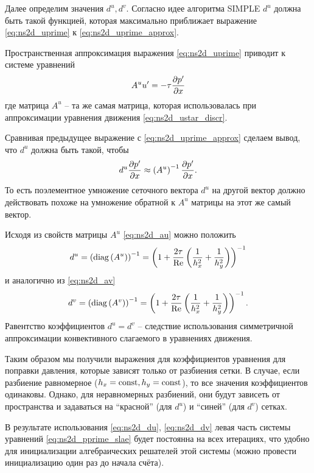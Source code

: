 Далее определим значения $d^u, d^v$.
Согласно идее алгоритма SIMPLE $d^u$ должна
быть такой функцией, которая максимально приближает
выражение \eqref{eq:ns2d_uprime} к \eqref{eq:ns2d_uprime_approx}.

Пространственная аппроксимация выражения \eqref{eq:ns2d_uprime}
приводит к системе уравнений
\begin{equation*}
    A^u u' = -\tau\frac{\partial p'}{\partial x}
\end{equation*}
где матрица $A^u$ -- та же самая матрица, которая использовалась
при аппроксимации уравнения движения \eqref{eq:ns2d_ustar_discr}.

Сравнивая предыдущее выражение с \eqref{eq:ns2d_uprime_approx}
сделаем вывод, что $d^u$ должна быть такой, чтобы
\begin{equation*}
    d^u \frac{\partial p'}{\partial x} \approx \left(A^u\right)^{-1} \frac{\partial p'}{\partial x}.
\end{equation*}
То есть поэлементное умножение сеточного вектора ${d^u}$ 
на другой вектор
должно действовать похоже на умножение обратной к $A^u$ матрицы на этот же самый вектор.

Исходя из свойств матрицы $A^u$ \eqref{eq:ns2d_au} можно
положить 
\begin{equation}
    \label{eq:ns2d_du}
    d^u = \left({\rm diag}\left(A^u\right)\right)^{-1} = 
        \left(1 + \frac{2\tau}{\mathrm{Re}}\left(\frac{1}{h_x^2} + \frac{1}{h_y^2}\right)\right)^{-1}
\end{equation}
и аналогично из \eqref{eq:ns2d_av}
\begin{equation}
    \label{eq:ns2d_dv}
    d^v = \left({\rm diag}\left(A^v\right) \right)^{-1}= 
        \left(1 + \frac{2\tau}{\mathrm{Re}}\left(\frac{1}{h_x^2} + \frac{1}{h_y^2}\right)\right)^{-1}.
\end{equation}
Равентство коэффициентов $d^u = d^v$ -- следствие использования симметричной
аппроксимации конвективного слагаемого в уравнениях движения.

Таким образом мы получили выражения для коэффициентов уравнения для поправки давления,
которые зависят только от разбиения сетки.
В случае, если разбиение равномерное ($h_x = {\rm const}, h_y = {\rm const}$),
то все значения коэффициентов одинаковы.
Однако, для неравномерных разбиений, они будут зависеть
от пространства и задаваться на ``красной'' (для $d^u$) и ``синей'' (для $d^v$)
сетках.

В результате использования \eqref{eq:ns2d_du}, \eqref{eq:ns2d_dv} левая часть системы уравнений \eqref{eq:ns2d_pprime_slae}
будет постоянна на всех итерациях, что удобно для инициализации алгебраических решателей этой системы
(можно провести инициализацию один раз до начала счёта).

